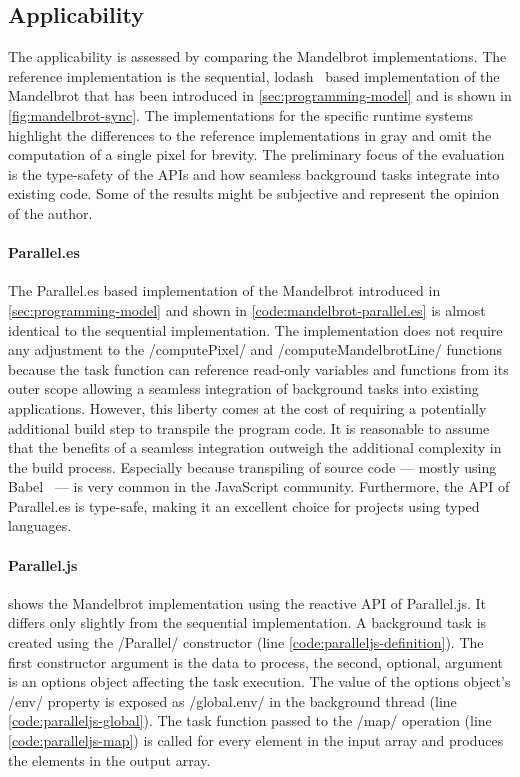 \subsection{Applicability}
The applicability is assessed by comparing the Mandelbrot implementations. The reference implementation is the sequential, lodash~\cite{lodash} based implementation of the Mandelbrot that has been introduced in \cref{sec:programming-model} and is shown in \cref{fig:mandelbrot-sync}. The implementations for the specific runtime systems highlight the differences to the reference implementations in gray and omit the computation of a single pixel for brevity. The preliminary focus of the evaluation is the type-safety of the APIs and how seamless background tasks integrate into existing code. Some of the results might be subjective and represent the opinion of the author. 

\paragraph{Parallel.es}
The Parallel.es based implementation of the Mandelbrot introduced in \cref{sec:programming-model} and shown in \cref{code:mandelbrot-parallel.es} is almost identical to the sequential implementation. The implementation does not require any adjustment to the \javascriptinline/computePixel/ and \javascriptinline/computeMandelbrotLine/ functions because the task function can reference read-only variables and functions from its outer scope allowing a seamless integration of background tasks into existing applications. However, this liberty comes at the cost of requiring a potentially additional build step to transpile the program code. It is reasonable to assume that the benefits of a seamless integration outweigh the additional complexity in the build process. Especially because transpiling of source code --- mostly using Babel~\cite{babel} --- is very common in the JavaScript community. Furthermore, the API of Parallel.es is type-safe, making it an excellent choice for projects using typed languages.

\paragraph{Parallel.js}
 shows the Mandelbrot implementation using the reactive API of Parallel.js. It differs only slightly from the sequential implementation. A background task is created using the \javascriptinline/Parallel/ constructor (line \ref{code:paralleljs-definition}). The first constructor argument is the data to process, the second, optional, argument is an options object affecting the task execution. The value of the options object's \javascriptinline/env/ property is exposed as \javascriptinline/global.env/ in the background thread (line \ref{code:paralleljs-global}). The task function passed to the \javascriptinline/map/ operation (line \ref{code:paralleljs-map}) is called for every element in the input array and produces the elements in the output array.

